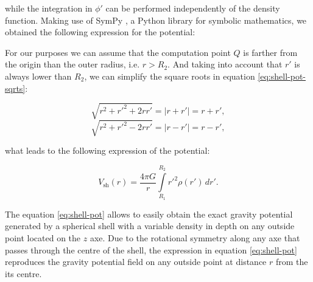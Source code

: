 \documentclass[extra]{gji}
\begin{document}
\noindent while the integration in $\phi'$ can be performed 
independently of the density function.
Making use of SymPy \citep{sympy2017}, a Python library for symbolic 
mathematics, we obtained the following expression for the potential:


For our purposes we can assume that the computation point $Q$ is 
farther from the origin than the outer radius, i.e. $r>R_2$. 
And taking into account that $r'$ is always lower than $R_2$, we can 
simplify the square roots in equation \ref{eq:shell-pot-sqrts}:

\begin{equation}
    \sqrt{r^2 + r'^2 + 2rr'} = |r + r'| = r + r',
\end{equation}
\begin{equation}
    \sqrt{r^2 + r'^2 - 2rr'} = |r - r'| = r - r',
\end{equation}

\noindent what leads to the following expression of the potential:

\begin{equation}
    V_\text{sh}(r) = \frac{4\pi G}{r}
    \int\limits_{R_1}^{R_2} {r'}^2 \rho(r') \, dr'.
\label{eq:shell-pot}
\end{equation}

The equation \ref{eq:shell-pot} allows to easily obtain the exact 
gravity potential generated by a spherical shell with a variable 
density in depth on any outside point located on the $z$ axe.
Due to the rotational symmetry along any axe that passes through the 
centre of the shell, the expression in equation \ref{eq:shell-pot} 
reproduces the gravity potential field on any outside point at distance 
$r$ from the its centre.
\end{document}

